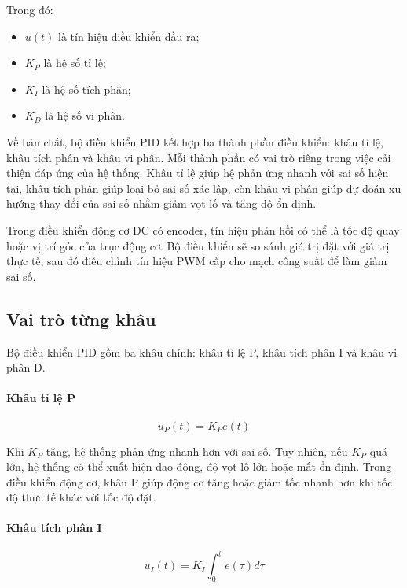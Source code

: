 Trong đó:
\begin{itemize}
    \item $u(t)$ là tín hiệu điều khiển đầu ra;
    \item $K_P$ là hệ số tỉ lệ;
    \item $K_I$ là hệ số tích phân;
    \item $K_D$ là hệ số vi phân.
\end{itemize}

Về bản chất, bộ điều khiển PID kết hợp ba thành phần điều khiển: khâu tỉ lệ, khâu tích phân và khâu vi phân. Mỗi thành phần có vai trò riêng trong việc cải thiện đáp ứng của hệ thống. Khâu tỉ lệ giúp hệ phản ứng nhanh với sai số hiện tại, khâu tích phân giúp loại bỏ sai số xác lập, còn khâu vi phân giúp dự đoán xu hướng thay đổi của sai số nhằm giảm vọt lố và tăng độ ổn định.

Trong điều khiển động cơ DC có encoder, tín hiệu phản hồi có thể là tốc độ quay hoặc vị trí góc của trục động cơ. Bộ điều khiển sẽ so sánh giá trị đặt với giá trị thực tế, sau đó điều chỉnh tín hiệu PWM cấp cho mạch công suất để làm giảm sai số.

\subsection{Vai trò từng khâu}

Bộ điều khiển PID gồm ba khâu chính: khâu tỉ lệ P, khâu tích phân I và khâu vi phân D.

\paragraph{Khâu tỉ lệ P}

\begin{equation}
    u_P(t) = K_P e(t)
\end{equation}

Khi $K_P$ tăng, hệ thống phản ứng nhanh hơn với sai số. Tuy nhiên, nếu $K_P$ quá lớn, hệ thống có thể xuất hiện dao động, độ vọt lố lớn hoặc mất ổn định. Trong điều khiển động cơ, khâu P giúp động cơ tăng hoặc giảm tốc nhanh hơn khi tốc độ thực tế khác với tốc độ đặt.

\paragraph{Khâu tích phân I}

\begin{equation}
    u_I(t) = K_I \int_{0}^{t} e(\tau)d\tau
\end{equation}


